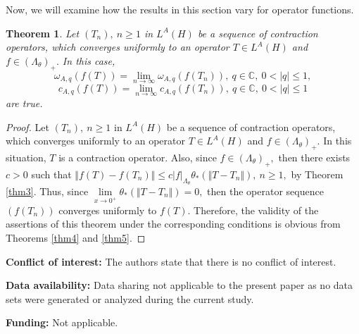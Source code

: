 \documentclass[preprint,12pt,3p]{elsarticle}
\newtheorem{theorem}{Theorem}
\begin{document}
Now, we will examine how the results in this section vary for operator functions.
\begin{theorem}
Let $ (T_{n}), \ n\geq 1 $ in $ L^{A}(H) $ be a sequence of contraction operators, which converges uniformly to an operator $ T\in L^{A}(H) $ and $ f\in (\Lambda_{\theta})_{+}. $ In this case,
$$
\omega_{A,q}(f(T))=\lim\limits_{n\rightarrow\infty}\omega_{A,q}(f(T_{n})), \ q\in \mathbb{C}, \ 0<\vert q \vert\leq 1,
$$
$$
c_{A,q}(f(T))=\lim\limits_{n\rightarrow\infty}c_{A,q}(f(T_{n})), \ q\in \mathbb{C}, \ 0<\vert q \vert\leq 1
$$
are true.
\end{theorem}
\begin{proof}
Let $ (T_{n}), \ n\geq 1 $ in $ L^{A}(H) $ be a sequence of contraction operators, which  converges uniformly to an operator $ T\in L^{A}(H) $ and $ f\in (\Lambda_{\theta})_{+}. $ In this situation, $ T $ is a contraction operator. Also, since $ f\in (\Lambda_{\theta})_{+}, $ then there exists $ c>0 $ such that $ \Vert f(T)-f(T_{n})\Vert\leq c \vert f \vert_{\Lambda_{\theta}}\theta_{*}(\Vert T-T_{n} \Vert), \ n\geq 1, $ by Theorem \ref{thm3}. Thus, since $ \lim\limits_{x\rightarrow 0^{+}}\theta_{*}(\Vert T-T_{n} \Vert)=0, $ then the operator sequence $ (f(T_{n})) $  converges uniformly to $ f(T). $ Therefore, the validity of the assertions of this theorem under the corresponding conditions is obvious from Theorems \ref{thm4} and \ref{thm5}. 
\end{proof}

\textbf{Conflict of interest:} The authors state that there is no conflict of interest.

\textbf{Data availability:} Data sharing not applicable to the present paper as no
data sets were generated or analyzed during the current study.

\textbf{Funding:} Not applicable.
\end{document}
